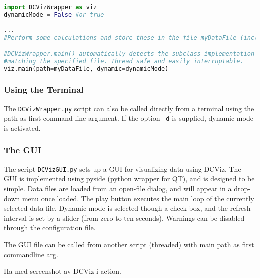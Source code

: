 \begin{lstlisting}[language=Python]
import DCVizWrapper as viz
dynamicMode = False #or true

...
#Perform some calculations and store these in the file myDataFile (including path)

#DCVizWrapper.main() automatically detects the subclass implementation 
#matching the specified file. Thread safe and easily interruptable.
viz.main(path=myDataFile, dynamic=dynamicMode)
\end{lstlisting}

\subsubsection{Using the Terminal}

The \verb+DCVizWrapper.py+ script can also be called directly from a terminal using the path as first command line argument. If the option \verb+-d+ is supplied, dynamic mode is activated.

\subsubsection{The GUI}

The script \verb+DCVizGUI.py+ sets up a GUI for visualizing data using DCViz. The GUI is implemented using pyside (python wrapper for QT), and is designed to be simple. Data files are loaded from an open-file dialog, and will appear in a drop-down menu once loaded. The play button executes the main loop of the currently selected data file. Dynamic mode is selected though a check-box, and the refresh interval is set by a slider (from zero to ten seconds). Warnings can be disabled through the configuration file.

The GUI file can be called from another script (threaded) with main path as first commandline arg. 

Ha med screenshot av DCViz i action.





